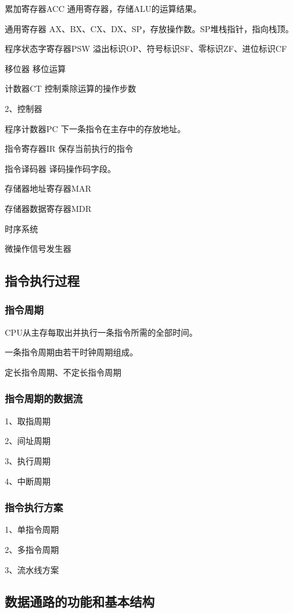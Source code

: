 \documentclass{ctexart}
\begin{document}
累加寄存器ACC
通用寄存器，存储ALU的运算结果。

通用寄存器
AX、BX、CX、DX、SP，存放操作数。SP堆栈指针，指向栈顶。

程序状态字寄存器PSW
溢出标识OP、符号标识SF、零标识ZF、进位标识CF

移位器
移位运算

计数器CT
控制乘除运算的操作步数

2、控制器

程序计数器PC
下一条指令在主存中的存放地址。

指令寄存器IR
保存当前执行的指令

指令译码器
译码操作码字段。

存储器地址寄存器MAR

存储器数据寄存器MDR

时序系统

微操作信号发生器



\subsection{指令执行过程}

\subsubsection{指令周期}

CPU从主存每取出并执行一条指令所需的全部时间。

一条指令周期由若干时钟周期组成。

定长指令周期、不定长指令周期

\subsubsection{指令周期的数据流}

1、取指周期

2、间址周期

3、执行周期

4、中断周期

\subsubsection{指令执行方案}

1、单指令周期

2、多指令周期

3、流水线方案


\subsection{数据通路的功能和基本结构}
\end{document}
